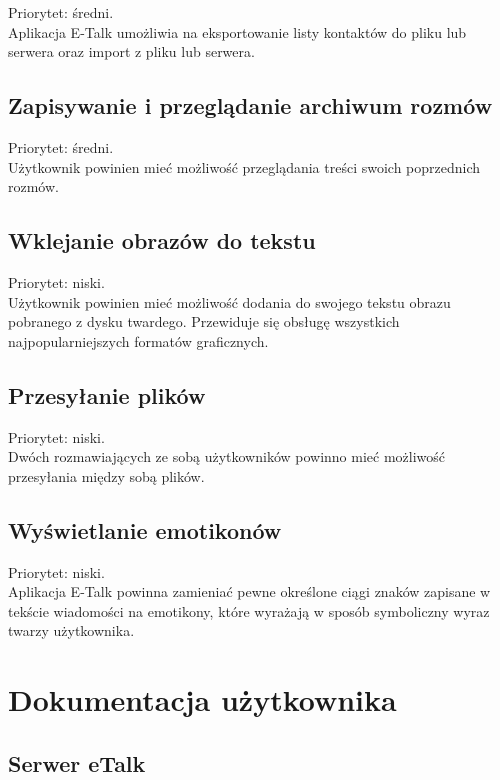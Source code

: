 \documentclass[a4paper,12pt]{article}
\begin{document}
Priorytet: średni.\\

Aplikacja E-Talk umożliwia na eksportowanie listy kontaktów do pliku lub serwera oraz import z pliku lub serwera.
\subsection[Zapisywanie i przeglądanie archiwum rozmów]{Zapisywanie i przeglądanie archiwum rozmów}
Priorytet: średni.\\

Użytkownik powinien mieć możliwość przeglądania treści swoich poprzednich rozmów.

\subsection[Wklejanie obrazów do tekstu]{Wklejanie obrazów do tekstu}

Priorytet: niski.\\

Użytkownik powinien mieć możliwość dodania do swojego tekstu obrazu pobranego z dysku twardego.
Przewiduje się obsługę wszystkich najpopularniejszych formatów graficznych.
\subsection[Przesyłanie plików]{Przesyłanie plików}

Priorytet: niski.\\

Dwóch rozmawiających ze sobą użytkowników powinno mieć możliwość przesyłania między sobą plików.
\subsection[Wyświetlanie emotikonów]{Wyświetlanie emotikonów}

Priorytet: niski.\\

Aplikacja E-Talk powinna zamieniać pewne określone ciągi znaków zapisane w tekście wiadomości na emotikony, które
wyrażają w sposób symboliczny wyraz twarzy użytkownika.

\section[Dokumentacja użytkownika]{Dokumentacja użytkownika}
\subsection[Serwer eTalk]{Serwer eTalk}
\end{document}
